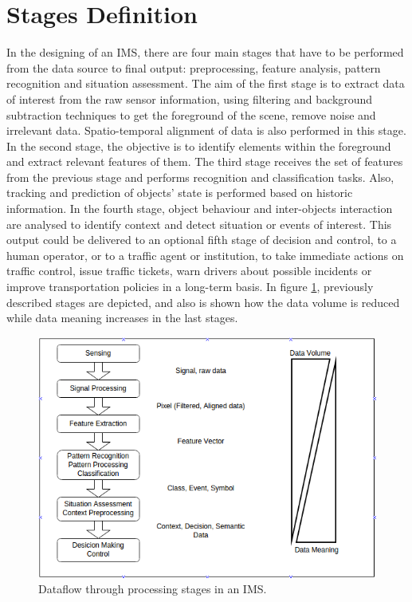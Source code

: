 \documentclass[10pt,twocolumn,letterpaper]{article}
\begin{document}
\section{Stages Definition}
In the designing of an IMS, there are four main stages that have to be performed from the data source to final output: preprocessing, feature analysis, pattern recognition and situation assessment. The aim of the first stage is to extract data of interest from the raw sensor information, using filtering and background subtraction techniques to get the foreground of the scene, remove noise and irrelevant data. Spatio-temporal alignment of data is also performed in this stage. In the second stage, the objective is to identify elements within the foreground and extract relevant features of them. The third stage receives the set of features from the previous stage and performs recognition and classification tasks. Also, tracking and prediction of objects' state is performed based on historic information. In the fourth stage, object behaviour and inter-objects interaction are analysed to identify context and detect situation or events of interest. This output could be delivered to an optional fifth stage of decision and control, to a human operator, or to a traffic agent or institution, to take immediate actions on traffic control, issue traffic tickets, warn drivers about possible incidents or improve transportation policies in a long-term basis. In figure \ref{proc_stages}, previously described stages are depicted, and also is shown how the data volume is reduced while data meaning increases in the last stages.

\begin{figure}[ht!]
\centering
\includegraphics[scale=0.35]{../fig/3/proc_stages.png}
\caption{Dataflow through processing stages in an IMS.}
\label{proc_stages}
\end{figure}
\end{document}
